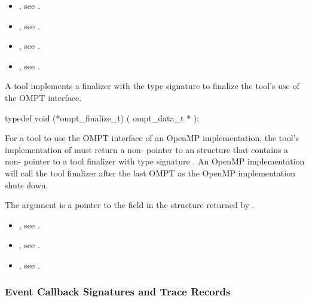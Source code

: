 \crossreferences
\begin{itemize}
\item {}, see
  .
\item {}, see .
\item {}, see
  .
\item {}, see .
\end{itemize}


\label{sec:ompt_finalize_t}

\summary
A tool implements a finalizer with the type signature
 to finalize the tool's use of
the OMPT interface.

\format

\begin{ccppspecific}
\begin{omptInquiry}
typedef void (*ompt_finalize_t) (
  ompt_data_t *
);
\end{omptInquiry}
\end{ccppspecific}


\descr
For a tool to use the OMPT interface of an OpenMP implementation,
the tool's implementation of  must return a
non- pointer to an
 structure that contains a
non- pointer to a tool finalizer with
type signature .
An OpenMP implementation will call the tool finalizer
after the last OMPT  as the OpenMP implementation shuts down.

\argdesc
The argument  is a pointer to the
 field in the 
structure returned by .

\crossreferences
\begin{itemize}
\item {}, see
  .
\item {}, see .
\item {}, see .
\end{itemize}


\subsubsection{Event Callback Signatures and Trace Records}
\label{sec:ToolsSupport_callback_signatures}

